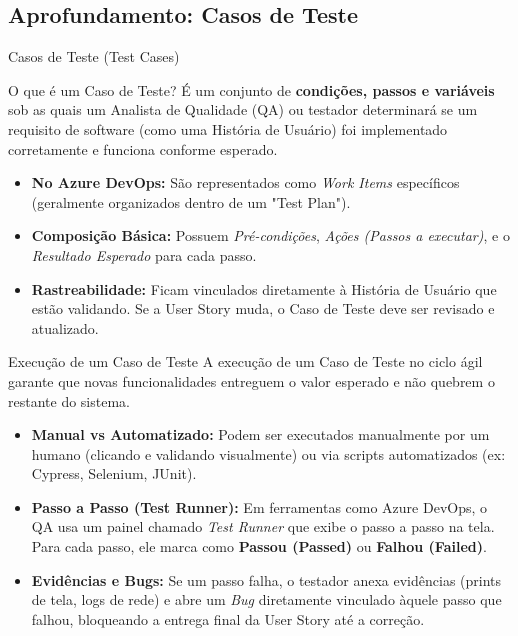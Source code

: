 \documentclass[aspectratio=169, 9pt]{beamer}
\begin{document}

\subsection{Aprofundamento: Casos de Teste}
\begin{frame}{Casos de Teste (Test Cases)}
  \begin{block}{O que é um Caso de Teste?}
    É um conjunto de \textbf{condições, passos e variáveis} sob as quais um Analista de Qualidade (QA) ou testador determinará se um requisito de software (como uma História de Usuário) foi implementado corretamente e funciona conforme esperado.
  \end{block}
  
  \vspace{0.2cm}
  \begin{itemize}
    \item \textbf{No Azure DevOps:} São representados como \textit{Work Items} específicos (geralmente organizados dentro de um "Test Plan").
    \item \textbf{Composição Básica:} Possuem \textit{Pré-condições}, \textit{Ações (Passos a executar)}, e o \textit{Resultado Esperado} para cada passo.
    \item \textbf{Rastreabilidade:} Ficam vinculados diretamente à História de Usuário que estão validando. Se a User Story muda, o Caso de Teste deve ser revisado e atualizado.
  \end{itemize}
\end{frame}

\begin{frame}{Execução de um Caso de Teste}
  A execução de um Caso de Teste no ciclo ágil garante que novas funcionalidades entreguem o valor esperado e não quebrem o restante do sistema.

  \vspace{0.3cm}
  \begin{itemize}
    \item \textbf{Manual vs Automatizado:} Podem ser executados manualmente por um humano (clicando e validando visualmente) ou via scripts automatizados (ex: Cypress, Selenium, JUnit).
    \item \textbf{Passo a Passo (Test Runner):} Em ferramentas como Azure DevOps, o QA usa um painel chamado \textit{Test Runner} que exibe o passo a passo na tela. Para cada passo, ele marca como \textcolor{green!60!black}{\textbf{Passou (Passed)}} ou \textcolor{red!80!black}{\textbf{Falhou (Failed)}}.
    \item \textbf{Evidências e Bugs:} Se um passo falha, o testador anexa evidências (prints de tela, logs de rede) e abre um \textit{Bug} diretamente vinculado àquele passo que falhou, bloqueando a entrega final da User Story até a correção.
  \end{itemize}
\end{frame}
\end{document}
